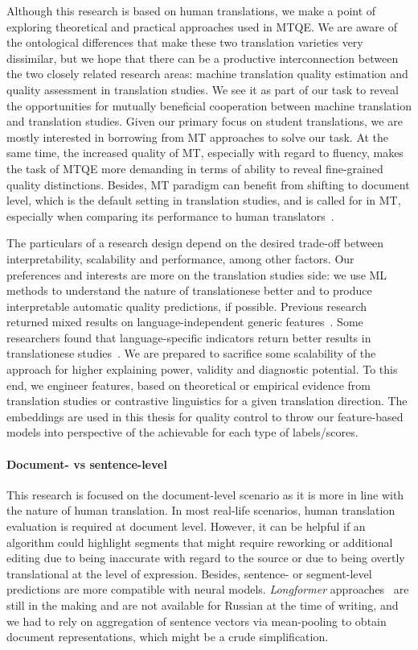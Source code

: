 Although this research is based on human translations, we make a point of exploring theoretical and practical approaches used in \gls*{MTQE}. We are aware of the ontological differences that make these two translation varieties very dissimilar, but we hope that there can be a productive interconnection between the two closely related research areas: machine translation quality estimation and quality assessment in translation studies. 
We see it as part of our task to reveal the opportunities for mutually beneficial cooperation between machine translation and translation studies. Given our primary focus on student translations, we are mostly interested in borrowing from MT approaches to solve our task. At the same time, the increased quality of MT, especially with regard to fluency, makes the task of MTQE more demanding in terms of ability to reveal fine-grained quality distinctions.
Besides, MT paradigm can benefit from shifting to document level, which is the default setting in translation studies, and is called for in MT, especially when comparing its performance to human translators~\citep{Laubli2018,Voita2019}.

The particulars of a research design depend on the desired trade-off between interpretability, scalability and performance, among other factors. Our preferences and interests are more on the translation studies side: we use ML methods to understand the nature of translationese better and to produce interpretable automatic quality predictions, if possible. Previous research returned mixed results on language-independent generic features~\citep{Sutter2017}. Some researchers found that language-specific indicators return better results in translationese studies~\citep{Hu2021}. We are prepared to sacrifice some scalability of the approach for higher explaining power, validity and diagnostic potential. To this end, we engineer features, based on theoretical or empirical evidence from translation studies or contrastive linguistics for a given translation direction. The embeddings are used in this thesis for quality control to throw our feature-based models into perspective of the achievable for each type of labels/scores. 

\paragraph{Document- vs sentence-level} This research is focused on the document-level scenario as it is more in line with the nature of human translation. In most real-life scenarios, human translation evaluation is required at document level. 
However, it can be helpful if an algorithm could highlight segments that might require reworking or additional editing due to being inaccurate with regard to the source or due to being overtly translational at the level of expression. Besides, sentence- or segment-level predictions are more compatible with neural models. \textit{Longformer} approaches~\cite{Beltagy2020} are still in the making and are not available for Russian at the time of writing, and we had to rely on aggregation of sentence vectors via mean-pooling to obtain document representations, which might be a crude simplification.

